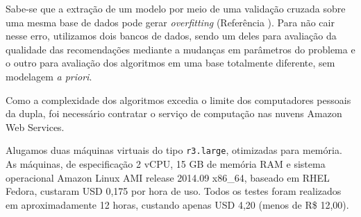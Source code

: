 Sabe-se que a extração de um modelo por meio de uma validação cruzada sobre uma mesma base de dados pode gerar \textit{overfitting} (Referência ). Para não cair nesse erro, utilizamos dois bancos de dados, sendo um deles para avaliação da qualidade das recomendações mediante a mudanças em parâmetros do problema e o outro para avaliação dos algoritmos em uma base totalmente diferente, sem modelagem \textit{a priori}.


Como a complexidade dos algoritmos excedia o limite dos computadores pessoais da dupla, foi necessário contratar o serviço de computação nas nuvens Amazon Web Services.

Alugamos duas máquinas virtuais do tipo \texttt{r3.large}, otimizadas para memória. As máquinas, de especificação 2 vCPU, 15 GB de memória RAM e sistema operacional Amazon Linux AMI release 2014.09 x86\_64, baseado em RHEL Fedora, custaram USD 0,175 por hora de uso. Todos os testes foram realizados em aproximadamente 12 horas, custando apenas USD 4,20 (menos de R\$ 12,00).
